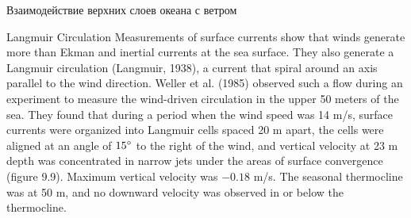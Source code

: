 \begin{chapter}{Взаимодействие верхних слоев океана с ветром}
\begin{section}{Langmuir Circulation}
Measurements of surface currents show that
winds generate more than Ekman and inertial
currents at the sea surface.  They also
generate a Langmuir circulation (Langmuir, 1938), a current that
spiral around an axis parallel to the wind direction. Weller et
al. (1985) observed such a flow during an experiment to measure the
wind-driven circulation in the upper 50 meters of the sea.  They found
that during a period when the wind speed was 14 m/s, surface currents
were organized into Langmuir cells spaced 20 m apart, the cells were
aligned at an angle of ${15}^\circ$ to the right of the wind, and
vertical velocity at 23 m depth was concentrated in narrow jets under
the areas of surface convergence (figure 9.9).  Maximum vertical
velocity was $-0.18$ m/s. The seasonal
thermocline was at 50 m, and no downward
velocity was observed in or below the thermocline.
%
\end{section}


\end{chapter}
